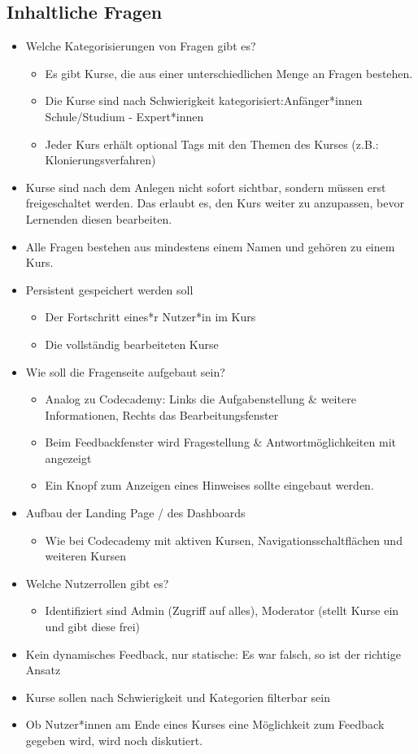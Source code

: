 \documentclass[colorback, accentcolor=tud1c, paper=a4]{tudexercise}
\begin{document}
\begin{multicols}{2}
\subsection*{Inhaltliche Fragen}
	\begin{itemize}
	\item Welche Kategorisierungen von Fragen gibt es?
	\begin{itemize}
		\item Es gibt Kurse, die aus einer unterschiedlichen Menge an Fragen bestehen.
		\item Die Kurse sind nach Schwierigkeit kategorisiert:Anfänger*innen Schule/Studium - Expert*innen
		\item Jeder Kurs erhält optional Tags mit den Themen des Kurses (z.B.: Klonierungsverfahren)
	\end{itemize}
	\item Kurse sind nach dem Anlegen nicht sofort sichtbar, sondern müssen erst freigeschaltet werden. Das erlaubt es, den Kurs weiter zu anzupassen, bevor Lernenden diesen bearbeiten.
	\item Alle Fragen bestehen aus mindestens einem Namen und gehören zu einem Kurs.
	\item Persistent gespeichert werden soll
		\begin{itemize}
		\item Der Fortschritt eines*r Nutzer*in im Kurs
		\item Die vollständig bearbeiteten Kurse
		\end{itemize}
	\item  Wie soll die Fragenseite aufgebaut sein?
		\begin{itemize}
		\item Analog zu Codecademy: Links die Aufgabenstellung \& weitere Informationen,  Rechts das Bearbeitungsfenster
    	\item Beim Feedbackfenster wird Fragestellung \& Antwortmöglichkeiten mit angezeigt
    	\item Ein Knopf zum Anzeigen eines Hinweises sollte eingebaut werden.
		\end{itemize}
	\item Aufbau der Landing Page / des Dashboards
		\begin{itemize}
		\item Wie bei Codecademy mit aktiven Kursen, Navigationsschaltflächen und weiteren Kursen
		\end{itemize}
	\item Welche Nutzerrollen gibt es?
		\begin{itemize}
		\item Identifiziert sind Admin (Zugriff auf alles), Moderator (stellt Kurse ein und gibt diese frei)
		\end{itemize}
	\item Kein dynamisches Feedback, nur statische: Es war falsch, so ist der richtige Ansatz
	\item Kurse sollen nach Schwierigkeit und Kategorien filterbar sein
	\item Ob Nutzer*innen am Ende eines Kurses eine Möglichkeit zum Feedback gegeben wird, wird noch diskutiert.
	\end{itemize}
		

\end{multicols}
\end{document}
